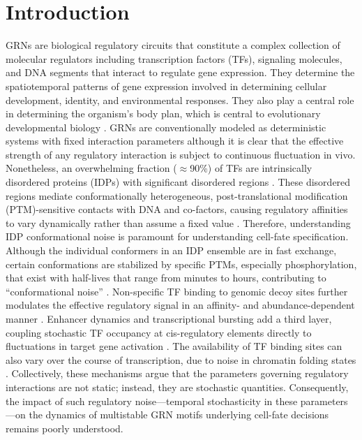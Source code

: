 \documentclass[11pt]{article}
\begin{document}
\section{Introduction}\label{sec:Intro}

GRNs are biological regulatory circuits that constitute a complex collection of molecular regulators including transcription factors (TFs), signaling molecules, and DNA segments that interact to regulate gene expression. They determine the spatiotemporal patterns of gene expression involved in determining cellular development, identity, and environmental responses. They also play a central role in determining the organism’s body plan, which is central to evolutionary developmental biology \cite{Davidson2005, Davidson2006, Maizels2026}. GRNs are conventionally modeled as deterministic systems with fixed interaction parameters although it is clear that the effective strength of any regulatory interaction is subject to continuous fluctuation in vivo. Nonetheless, an overwhelming fraction ($\approx$90\%) of TFs are intrinsically disordered proteins (IDPs) \cite{Staby2017} with significant disordered regions \cite{Ferrie2022Structure-functionRegulation, Holehouse2023TheRegions}. These disordered regions mediate conformationally heterogeneous, post-translational modification (PTM)-sensitive contacts with DNA and co-factors, causing regulatory affinities to vary dynamically rather than assume a fixed value . Therefore, understanding IDP conformational noise is paramount for understanding cell-fate specification. Although the individual conformers in an IDP ensemble are in fast exchange, certain conformations are stabilized by specific PTMs, especially phosphorylation, that exist with half-lives that range from minutes to hours, contributing to ``conformational noise'' \cite{Kulkarni2022, Kulkarni2019}. Non-specific TF binding to genomic decoy sites further modulates the effective regulatory signal in an affinity- and abundance-dependent manner \cite{Dey2020EnhancementSites, Burger2012InfluenceExpression}. Enhancer dynamics and transcriptional bursting add a third layer, coupling stochastic TF occupancy at cis-regulatory elements directly to fluctuations in target gene activation \cite{Raj2006StochasticCells, Fukaya2016EnhancerBursting}. The availability of TF binding sites can also vary over the course of transcription, due to noise in chromatin folding states \cite{Gamble2025}. Collectively, these mechanisms argue that the parameters governing regulatory interactions are not static; instead, they are stochastic quantities. Consequently, the impact of such regulatory noise—temporal stochasticity in these parameters—on the dynamics of multistable GRN motifs underlying cell-fate decisions remains poorly understood.
\end{document}
